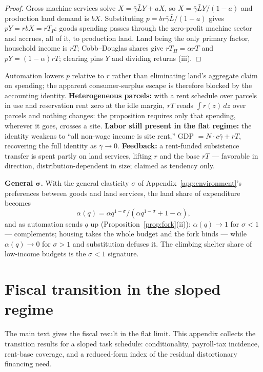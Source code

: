 \documentclass[12pt]{article}
\theoremstyle{plain}
\begin{document}
\begin{proof}
Gross machine services solve $X = \bar{\gamma}\bar{L}Y + aX$, so $X = \bar{\gamma}\bar{L}Y/(1-a)$ and production land demand is $bX$. Substituting $p = br\bar{\gamma}\bar{L}/(1-a)$ gives $pY = r bX = rT_P$: goods spending passes through the zero-profit machine sector and accrues, all of it, to production land. Land being the only primary factor, household income is $rT$; Cobb--Douglas shares give $rT_H = \alpha rT$ and $pY = (1-\alpha )rT$; clearing pins $Y$ and dividing returns (iii).
\end{proof}

Automation lowers $p$ relative to $r$ rather than eliminating land's aggregate claim on spending; the apparent consumer-surplus escape is therefore blocked by the accounting identity. \textbf{Heterogeneous parcels:} with a rent schedule over parcels in use and reservation rent zero at the idle margin, $rT$ reads $\int r(z)\,dz$ over parcels and nothing changes: the proposition requires only that spending, wherever it goes, crosses a site. \textbf{Labor still present in the flat regime:} the identity weakens to ``all non-wage income is site rent,'' GDP $= N\cdot c\bar{\gamma} + rT$, recovering the full identity as $\bar{\gamma} \to 0$. \textbf{Feedback:} a rent-funded subsistence transfer is spent partly on land services, lifting $r$ and the base $rT$ --- favorable in direction, distribution-dependent in size; claimed as tendency only.

\textbf{General $\bm{\sigma}$.} With the general elasticity $\sigma$ of Appendix~\ref{app:environment}'s preferences between goods and land services, the land share of expenditure becomes
\begin{equation}\label{eq:ces-share}
\alpha (q) = \alpha q^{1-\sigma} / (\alpha q^{1-\sigma} + 1 - \alpha ),
\end{equation}
and as automation sends $q$ up (Proposition~\ref{prop:fork}(ii)): $\alpha (q) \to 1$ for $\sigma < 1$ --- complements; housing takes the whole budget and the fork binds --- while $\alpha (q) \to 0$ for $\sigma > 1$ and substitution defuses it. The climbing shelter share of low-income budgets is the $\sigma < 1$ signature.

\section{Fiscal transition in the sloped regime}\label{app:fiscal}

The main text gives the fiscal result in the flat limit. This appendix collects the transition results for a sloped task schedule: conditionality, payroll-tax incidence, rent-base coverage, and a reduced-form index of the residual distortionary financing need.
\end{document}
